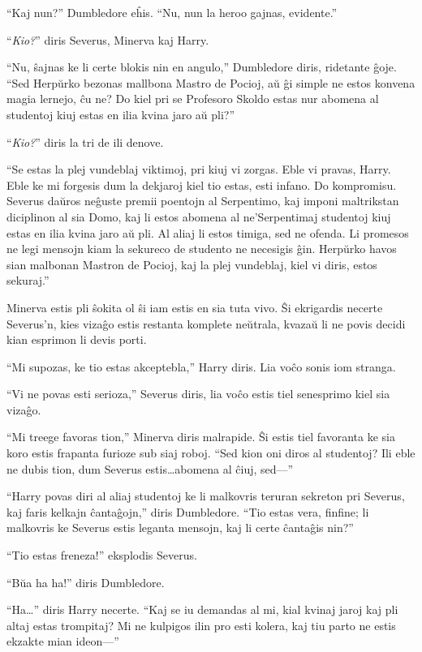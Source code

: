 ``Kaj nun?'' Dumbledore eĥis. ``Nu, nun la heroo gajnas, evidente.''

``\emph{Kio?}'' diris Severus, Minerva kaj Harry.

``Nu, ŝajnas ke li certe blokis nin en angulo,'' Dumbledore diris,
ridetante ĝoje. ``Sed Herpŭrko bezonas mallbona Mastro de Pocioj, aŭ
ĝi simple ne estos konvena magia lernejo, ĉu ne? Do kiel pri se
Profesoro Skoldo estas nur abomena al studentoj kiuj estas en ilia
kvina jaro aŭ pli?''

``\emph{Kio?}'' diris la tri de ili denove.

``Se estas la plej vundeblaj viktimoj, pri kiuj vi zorgas. Eble vi
pravas, Harry. Eble ke mi forgesis dum la dekjaroj kiel tio estas,
esti infano. Do kompromisu. Severus daŭros neĝuste premii poentojn al
Serpentimo, kaj imponi maltrikstan diciplinon al sia Domo, kaj li estos
abomena al ne'Serpentimaj studentoj kiuj estas en ilia kvina jaro aŭ
pli. Al aliaj li estos timiga, sed ne ofenda. Li promesos ne legi
mensojn kiam la sekureco de studento ne necesigis ĝin. Herpŭrko havos
sian malbonan Mastron de Pocioj, kaj la plej vundeblaj, kiel vi diris,
estos sekuraj.''

Minerva estis pli ŝokita ol ŝi iam estis en sia tuta vivo. Ŝi
ekrigardis necerte Severus'n, kies vizaĝo estis restanta komplete
neŭtrala, kvazaŭ li ne povis decidi kian esprimon li devis porti.

``Mi supozas, ke tio estas akceptebla,'' Harry diris. Lia voĉo sonis iom stranga.

``Vi ne povas esti serioza,'' Severus diris, lia voĉo estis tiel senesprimo kiel sia vizaĝo.

``Mi treege favoras tion,'' Minerva diris malrapide. Ŝi estis tiel
favoranta ke sia koro estis frapanta furioze sub siaj roboj. ``Sed
kion oni diros al studentoj? Ili eble ne dubis tion, dum Severus
estis\ldots abomena al ĉiuj, sed—''

``Harry povas diri al aliaj studentoj ke li malkovris teruran sekreton
pri Severus, kaj faris kelkajn ĉantaĝojn,'' diris Dumbledore. ``Tio
estas vera, finfine; li malkovris ke Severus estis leganta mensojn,
kaj li certe ĉantaĝis nin?''

``Tio estas freneza!'' eksplodis Severus.

``Bŭa ha ha!'' diris Dumbledore.

``Ha\ldots'' diris Harry necerte. ``Kaj se iu demandas al mi, kial
kvinaj jaroj kaj pli altaj estas trompitaj? Mi ne kulpigos ilin pro
esti kolera, kaj tiu parto ne estis ekzakte mian ideon—'' 

